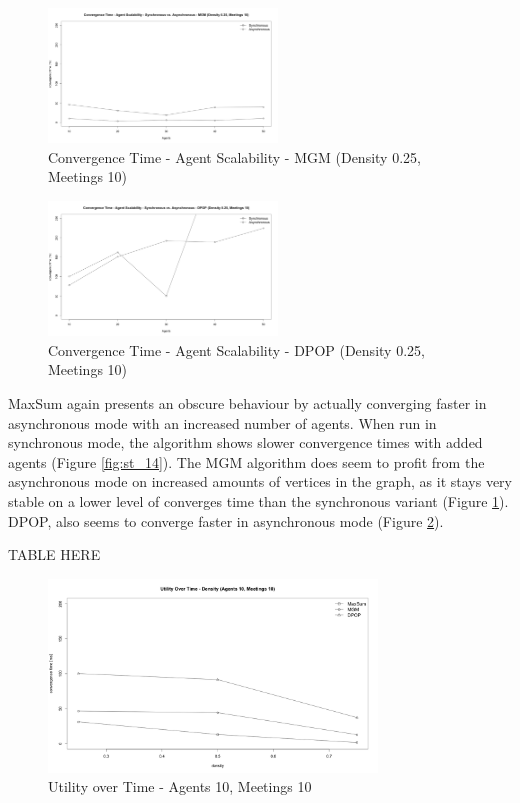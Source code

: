 \begin{figure}[H]
\centering
\includegraphics[width=230px]{graphics/experiments/static/st_15}
\caption{Convergence Time - Agent Scalability - MGM (Density 0.25, Meetings 10)}
\label{fig:st_15}
\end{figure}

\begin{figure}[H]
\centering
\includegraphics[width=230px]{graphics/experiments/static/st_16}
\caption{Convergence Time - Agent Scalability - DPOP (Density 0.25, Meetings 10)}
\label{fig:st_16}
\end{figure}

MaxSum again presents an obscure behaviour by actually converging faster in asynchronous mode with an increased number of agents. When run in synchronous mode, the algorithm shows slower convergence times with added agents (Figure \ref{fig:st_14}). The MGM algorithm does seem to profit from the asynchronous mode on increased amounts of vertices in the graph, as it stays very stable on a lower level of converges time than the synchronous variant (Figure \ref{fig:st_15}). DPOP, also seems to converge faster in asynchronous mode (Figure \ref{fig:st_16}).

TABLE HERE


\begin{figure}[H]
\centering
\includegraphics[width=330px]{graphics/experiments/static/st_17}
\caption{Utility over Time - Agents 10, Meetings 10}
\label{fig:st_17}
\end{figure}

